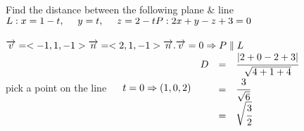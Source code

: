 \noindent{\color{smalt(darkpowderblue)}\rule{\linewidth}{.2mm}}
\begin{example}
Find the distance between the following plane $\&$ line \\$ L : x=1-t, ~~~~ y=t, ~~~~ z=2-t \\
P : 2x+y-z+3=0 $\\
{} \\
$\overrightarrow{v}=<-1,1,-1> \\
\overrightarrow{n}=<2,1,-1> \\
\overrightarrow{n} . \overrightarrow{v}=0 \Rightarrow P \parallel L$\\ pick a point on the line ~~ $t=0 \Rightarrow (1,0,2) \\ $
$\begin{array}{rcl}
D & = & \cfrac{|2+0-2+3|}{\sqrt{4+1+4}}  \\
 & = & \cfrac{3}{\sqrt{6}} \\
 & = & \sqrt{\cfrac{3}{2}}
\end{array}$
\end{example}
\noindent{\color{smalt(darkpowderblue)}\rule{\linewidth}{.2mm}}

